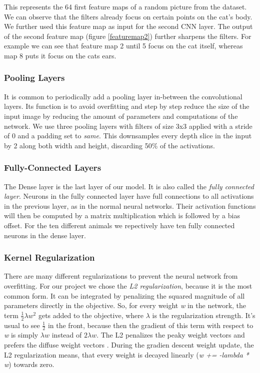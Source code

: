 \documentclass[journal]{IEEEtran}
\begin{document}
This represents the 64 first feature maps of a random picture from the dataset. We can observe that the filters already focus on certain points on the cat's body. We further used this feature map as input for the second CNN layer. The output of the second feature map (figure \ref{featuremap2}) further sharpens the filters. For example we can see that feature map 2 until 5 focus on the cat itself, whereas map 8 puts it focus on the cats ears. \\

\subsubsection{Pooling Layers}
\noindent It is common to periodically add a pooling layer in-between the convolutional layers. Its function is to avoid overfitting and step by step reduce the size of the input image by reducing the amount of parameters and computations of the network. We use three pooling layers with filters of size 3x3 applied with a stride of 0 and a padding set to \textit{same}. This downsamples every depth slice in the input by 2 along both width and height, discarding 50\% of the activations. \\
\subsubsection{Fully-Connected Layers}
\noindent The Dense layer is the last layer of our model. It is also called the \textit{fully connected layer}. Neurons in the fully connected layer have full connections to all activations in the previous layer, as in the normal neural networks. Their activation functions will then be computed by a matrix multiplication which is followed by a bias offset. 
For the ten different animals we repectively have ten fully connected neurons in the dense layer. \\
\subsubsection{Kernel Regularization}
\noindent There are many different regularizations to prevent the neural network from overfitting. For our project we chose the \textit{L2 regularization}, because it is the most common form.
It can be integrated by penalizing the squared magnitude of all parameters directly in the objective. So, for every weight \textit{w} in the network, the term \(\frac{1}{2} \lambda w^2\) gets added to the objective, where \(\lambda \) is the regularization strength. It's usual to see \(\frac{1}{2}\) in the front, because then the gradient of this term with respect to \textit{w} is simply \(\lambda w\) instead of \(2 \lambda w\). The L2 penalizes the peaky weight vectors and prefers the diffuse weight vectors \cite{RN4}. During the gradien descent weight update, the L2 regularization means, that every weight is decayed linearly (\textit{w += -lambda * w}) towards zero. \\
\end{document}

